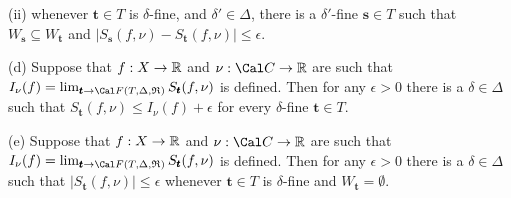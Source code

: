 \quad(ii) whenever $\pmb{t}\in T$ is $\delta$-fine, and
$\delta'\in\Delta$, there is a $\delta'$-fine $\pmb{s}\in T$ such that
$W_{\pmb{s}}\subseteq W_{\pmb{t}}$ and
$|S_{\pmb{s}}(f,\nu)-S_{\pmb{t}}(f,\nu)|\le\epsilon$.

(d) Suppose that $f:X\to\Bbb R$ and
$\nu:\Cal C\to\Bbb R$ are such that
$I_{\nu}(f)
=\lim_{\pmb{t}\to\Cal F(T,\Delta,\frak R)}S_{\pmb{t}}(f,\nu)$
is defined.   Then for any $\epsilon>0$ there is a
$\delta\in\Delta$
such that $S_{\pmb{t}}(f,\nu)\le I_{\nu}(f)+\epsilon$ for every
$\delta$-fine $\pmb{t}\in T$.

(e) Suppose that $f:X\to\Bbb R$ and
$\nu:\Cal C\to\Bbb R$ are such that $I_{\nu}(f)
=\lim_{\pmb{t}\to\Cal F(T,\Delta,\frak R)}S_{\pmb{t}}(f,\nu)$
is defined.   Then for any $\epsilon>0$ there is a $\delta\in\Delta$ 
such that $|S_{\pmb{t}}(f,\nu)|\le\epsilon$ whenever $\pmb{t}\in T$ is
$\delta$-fine and $W_{\pmb{t}}=\emptyset$.

